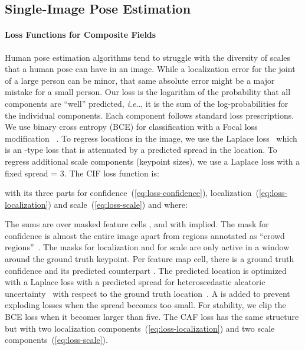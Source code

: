 \documentclass[journal]{IEEEtran}
\makeatletter
\DeclareRobustCommand\onedot{\futurelet\@let@token\@onedot}
\def\@onedot{\ifx\@let@token.\else.\null\fi\xspace}
\def\ie{\emph{i.e}\onedot} \def\Ie{\emph{I.e}\onedot}
\makeatother
\begin{document}
\vspace{0.1cm}
\subsection{Single-Image Pose Estimation}
\label{sec:single-image}


\paragraph{Loss Functions for Composite Fields}
\label{sec:loss-functions}
Human pose estimation algorithms tend to struggle with the diversity of scales that
a human pose can have in an image. While a localization error for the joint of
a large person can be minor, that same absolute error might be a major mistake
for a small person. Our loss is the logarithm of the probability that all
components are ``well'' predicted, \ie, it is the sum of the log-probabilities
for the individual components. Each component follows standard loss prescriptions.
We use binary cross entropy (BCE) for classification with a Focal loss
modification ~\cite{lin2017focal}.
To regress locations in the image, we use the Laplace loss~\cite{kendall2017uncertainties}
which is an -type loss
that is attenuated by a predicted spread  in the location.
To regress additional scale components (keypoint sizes), we use a Laplace loss with
a fixed spread  = 3.
The CIF loss function is:

with its three parts for confidence~(\ref{eq:loss-confidence}),
localization~(\ref{eq:loss-localization}) and scale~(\ref{eq:loss-scale})
and where:

The sums are over masked feature cells ,  and  with  implied.
The mask for confidence  is almost the entire image apart from regions
annotated as ``crowd regions''~\cite{lin2014microsoft}. The masks for localization
 and for scale  are only active in a  window around the
ground truth keypoint. Per feature map cell, there is a ground truth confidence
 and its predicted counterpart . The predicted location
 is optimized with a Laplace loss with a predicted
spread  for heteroscedastic aleatoric
uncertainty~\cite{kendall2017uncertainties} with respect to the ground truth
location~.
A  is added to prevent exploding losses when
the spread becomes too small. For stability, we clip the BCE loss when it becomes
larger than five.
The CAF loss has the same structure but with two localization
components~(\ref{eq:loss-localization}) and two scale components~(\ref{eq:loss-scale}).
\end{document}
